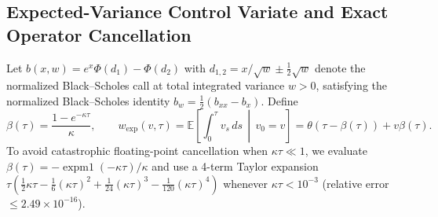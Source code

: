 \documentclass[preprint,12pt]{elsarticle}
\begin{document}
\subsection{Expected-Variance Control Variate and Exact Operator Cancellation}

Let $b(x, w) = e^x \Phi(d_1) - \Phi(d_2)$ with $d_{1,2} = x/\sqrt{w} \pm \frac{1}{2}\sqrt{w}$ denote the normalized Black--Scholes call at total integrated variance $w > 0$, satisfying the normalized Black--Scholes identity $b_w = \frac{1}{2}(b_{xx} - b_x)$. Define
\begin{equation}
  \beta(\tau) = \frac{1 - e^{-\kappa\tau}}{\kappa}, \qquad w_{\mathrm{exp}}(v, \tau) = \mathbb{E}\!\left[\int_0^\tau v_s\,ds \,\middle|\, v_0 = v\right] = \theta(\tau - \beta(\tau)) + v\beta(\tau).
  \label{eq:w_exp}
\end{equation}
To avoid catastrophic floating-point cancellation when $\kappa\tau \ll 1$, we evaluate $\beta(\tau) = -\operatorname{expm1}(-\kappa\tau)/\kappa$ and use a 4-term Taylor expansion $\tau(\frac{1}{2}\kappa\tau - \frac{1}{6}(\kappa\tau)^2 + \frac{1}{24}(\kappa\tau)^3 - \frac{1}{120}(\kappa\tau)^4)$ whenever $\kappa\tau < 10^{-3}$ (relative error $\le 2.49 \times 10^{-16}$).
\end{document}
